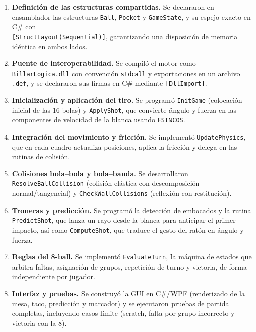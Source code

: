 \documentclass[a4paper,12pt]{article}
\begin{document}
\begin{enumerate}[label=\textbf{\arabic*.}]
    \item \textbf{Definición de las estructuras compartidas.} Se declararon en ensamblador las estructuras \texttt{Ball}, \texttt{Pocket} y \texttt{GameState}, y su espejo exacto en C\# con\\\texttt{[StructLayout(Sequential)]}, garantizando una disposición de memoria idéntica en ambos lados.

    \item \textbf{Puente de interoperabilidad.} Se compiló el motor como \texttt{BillarLogica.dll} con convención \texttt{stdcall} y exportaciones en un archivo \texttt{.def}, y se declararon sus firmas en C\# mediante \texttt{[DllImport]}.

    \item \textbf{Inicialización y aplicación del tiro.} Se programó \texttt{InitGame} (colocación inicial de las 16 bolas) y \texttt{ApplyShot}, que convierte ángulo y fuerza en las componentes de velocidad de la blanca usando \texttt{FSINCOS}.

    \item \textbf{Integración del movimiento y fricción.} Se implementó \texttt{UpdatePhysics}, que en cada cuadro actualiza posiciones, aplica la fricción y delega en las rutinas de colisión.

    \item \textbf{Colisiones bola--bola y bola--banda.} Se desarrollaron \texttt{ResolveBallCollision} (colisión elástica con descomposición normal/tangencial) y \texttt{CheckWallCollisions} (reflexión con restitución).

    \item \textbf{Troneras y predicción.} Se programó la detección de embocados y la rutina \texttt{PredictShot}, que lanza un rayo desde la blanca para anticipar el primer impacto, así como \texttt{ComputeShot}, que traduce el gesto del ratón en ángulo y fuerza.

    \item \textbf{Reglas del 8-ball.} Se implementó \texttt{EvaluateTurn}, la máquina de estados que arbitra faltas, asignación de grupos, repetición de turno y victoria, de forma independiente por jugador.

    \item \textbf{Interfaz y pruebas.} Se construyó la GUI en C\#/WPF (renderizado de la mesa, taco, predicción y marcador) y se ejecutaron pruebas de partida completas, incluyendo casos límite (scratch, falta por grupo incorrecto y victoria con la 8).
\end{enumerate}
\end{document}
